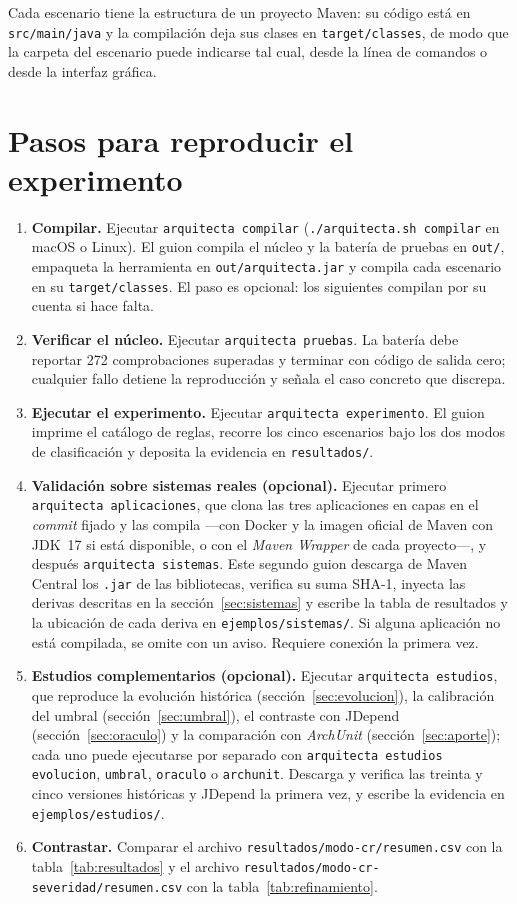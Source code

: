 \noindent Cada escenario tiene la estructura de un proyecto Maven: su código está en \texttt{src/main/java} y la compilación deja sus clases en \texttt{target/classes}, de modo que la carpeta del escenario puede indicarse tal cual, desde la línea de comandos o desde la interfaz gráfica.

\section{Pasos para reproducir el experimento}
\begin{enumerate}
    \item \textbf{Compilar.} Ejecutar \texttt{arquitecta compilar} (\texttt{./arquitecta.sh compilar} en macOS o Linux). El guion compila el núcleo y la batería de pruebas en \texttt{out/}, empaqueta la herramienta en \texttt{out/arquitecta.jar} y compila cada escenario en su \texttt{target/classes}. El paso es opcional: los siguientes compilan por su cuenta si hace falta.
    \item \textbf{Verificar el núcleo.} Ejecutar \texttt{arquitecta pruebas}. La batería debe reportar 272 comprobaciones superadas y terminar con código de salida cero; cualquier fallo detiene la reproducción y señala el caso concreto que discrepa.
    \item \textbf{Ejecutar el experimento.} Ejecutar \texttt{arquitecta experimento}. El guion imprime el catálogo de reglas, recorre los cinco escenarios bajo los dos modos de clasificación y deposita la evidencia en \texttt{resultados/}.
    \item \textbf{Validación sobre sistemas reales (opcional).} Ejecutar primero \texttt{arquitecta aplicaciones}, que clona las tres aplicaciones en capas en el \textit{commit} fijado y las compila ---con Docker y la imagen oficial de Maven con JDK~17 si está disponible, o con el \textit{Maven Wrapper} de cada proyecto---, y después \texttt{arquitecta sistemas}. Este segundo guion descarga de Maven Central los \texttt{.jar} de las bibliotecas, verifica su suma SHA-1, inyecta las derivas descritas en la sección~\ref{sec:sistemas} y escribe la tabla de resultados y la ubicación de cada deriva en \texttt{ejemplos/sistemas/}. Si alguna aplicación no está compilada, se omite con un aviso. Requiere conexión la primera vez.
    \item \textbf{Estudios complementarios (opcional).} Ejecutar \texttt{arquitecta estudios}, que reproduce la evolución histórica (sección~\ref{sec:evolucion}), la calibración del umbral (sección~\ref{sec:umbral}), el contraste con JDepend (sección~\ref{sec:oraculo}) y la comparación con \textit{ArchUnit} (sección~\ref{sec:aporte}); cada uno puede ejecutarse por separado con \texttt{arquitecta estudios evolucion}, \texttt{umbral}, \texttt{oraculo} o \texttt{archunit}. Descarga y verifica las treinta y cinco versiones históricas y JDepend la primera vez, y escribe la evidencia en \texttt{ejemplos/estudios/}.
    \item \textbf{Contrastar.} Comparar el archivo \texttt{resultados/modo-cr/resumen.csv} con la tabla~\ref{tab:resultados} y el archivo \texttt{resultados/modo-cr-severidad/resumen.csv} con la tabla~\ref{tab:refinamiento}.
\end{enumerate}

